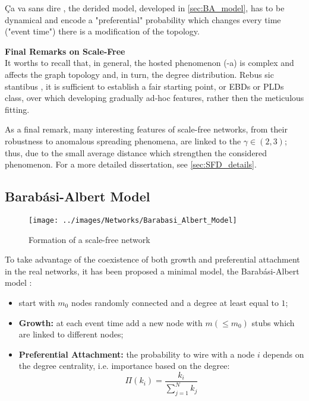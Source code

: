 \documentclass[a4paper,10pt,twoside]{book} %
\theoremstyle{definition}
\begin{document}
Ça va sans dire \label{cit:A.Marzo}, the derided model, developed in \autoref{sec:BA_model}, has to be dynamical and encode a "preferential" probability which changes every time ("event time") there is a modification of the topology. 

{\large \textbf{Final Remarks on Scale-Free}} \\
It worths to recall that, in general, the hosted phenomenon (-a) is complex and affects the graph topology and, in turn, the degree distribution. Rebus sic stantibus \label{cit:D.Massa}, it is sufficient to establish a fair starting point, or EBDs or PLDs class, over which developing gradually ad-hoc features, rather then the meticulous fitting.

As a final remark, many interesting features of scale-free networks, from their robustness to anomalous spreading phenomena, are linked to the $\gamma \in (2,3)$; thus, due to the small average distance which strengthen the considered phenomenon.
For a more detailed dissertation, see \autoref{sec:SFD_details}.

\newpage
\subsection{Barabási-Albert Model}
\begin{figure}[ht]
	\texttt{[image: ../images/Networks/Barabasi\_Albert\_Model]}
	\centering
	\caption{Formation of a scale-free network \cite{Barabasi:2009_SF_DecadeBeyond}}
	\label{fig:LCD_growth}
\end{figure}

\label{sec:BA_model}
To take advantage of the coexistence of both growth and preferential attachment in the real networks, it has been proposed a minimal model, the Barabási-Albert model \cite{barabasi::2016networkbook}:
\begin{itemize}
	\item start with $m_0$ nodes randomly connected and a degree at least equal to $1$;
	\item \textbf{Growth:} at each event time add a new node with $m(\leq  m_0)$ stubs which are linked to different nodes;
	\item \textbf{Preferential Attachment:} the probability to wire with a node $i$ depends on the degree centrality, i.e. importance based on the degree:
	\begin{equation}
		\Pi(k_i) = \frac{k_i}{\sum_{j = 1}^N k_j}
	\end{equation}
\end{itemize}
\end{document}
